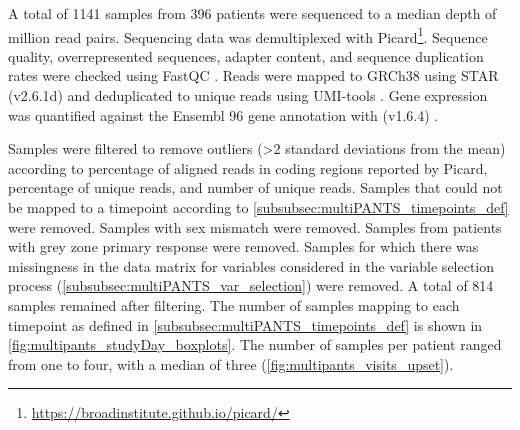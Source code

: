 A total of 1141 samples from 396 patients were sequenced to a median depth of  million read pairs.
Sequencing data was demultiplexed with Picard\footnote{\url{https://broadinstitute.github.io/picard/}}.
Sequence quality, overrepresented sequences, adapter content, and sequence duplication rates were checked using FastQC \autocite{simonandrews2010FastQCQualityControl}.
%
Reads were mapped to GRCh38 using STAR (v2.6.1d) \autocite{dobin2013STARUltrafastUniversal} and deduplicated to unique reads using UMI-tools \autocite{smith2017UMItoolsModelingSequencing}.
Gene expression was quantified against the Ensembl 96 gene annotation with  (v1.6.4) \autocite{liao2014FeatureCountsEfficientGeneral}.

Samples were filtered to remove outliers (\num{>2} standard deviations from the mean) according to percentage of aligned reads in coding regions reported by Picard, percentage of unique reads, and number of unique reads.
Samples that could not be mapped to a timepoint according to \cref{subsubsec:multiPANTS_timepoints_def} were removed.
Samples with sex mismatch were removed.
Samples from patients with grey zone primary response were removed.
Samples for which there was missingness in the data matrix for variables considered in the variable selection process (\cref{subsubsec:multiPANTS_var_selection}) were removed.
A total of 814 samples remained after filtering.
The number of samples mapping to each timepoint as defined in \cref{subsubsec:multiPANTS_timepoints_def} is shown in \cref{fig:multipants_studyDay_boxplots}.
The number of samples per patient ranged from one to four, with a median of three (\cref{fig:multipants_visits_upset}).

